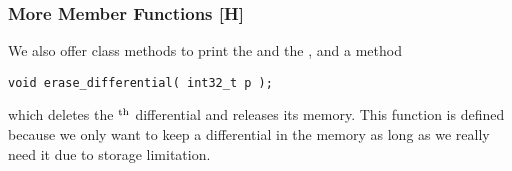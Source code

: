 \subsubsection{More Member Functions [H]}
\label{chapter_program:kappa:css:more_methods}

We also offer class methods to print the  and the , and a method
\begin{lstlisting}
void erase_differential( int32_t p );
\end{lstlisting}
which deletes the ${}^{\text{th}}$ differential and releases its memory. 
This function is defined because we only want to keep a differential in the memory
as long as we really need it due to storage limitation.